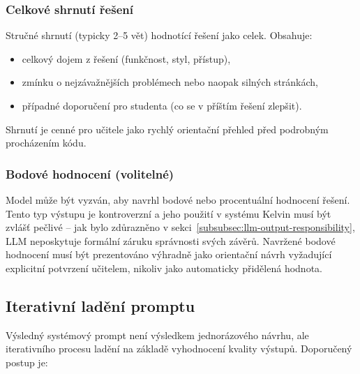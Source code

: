 \subsubsection*{Celkové shrnutí řešení}

Stručné shrnutí (typicky 2--5 vět) hodnotící řešení jako celek.
Obsahuje:
\begin{itemize}
    \item celkový dojem z řešení (funkčnost, styl, přístup),
    \item zmínku o nejzávažnějších problémech nebo naopak silných stránkách,
    \item případné doporučení pro studenta (co se v příštím řešení zlepšit).
\end{itemize}

Shrnutí je cenné pro učitele jako rychlý orientační přehled před podrobným procházením kódu.

\subsubsection*{Bodové hodnocení (volitelné)}

Model může být vyzván, aby navrhl bodové nebo procentuální hodnocení řešení.
Tento typ výstupu je kontroverzní a jeho použití v systému Kelvin musí být zvlášť pečlivé -- jak bylo zdůrazněno v sekci~\ref{subsubsec:llm-output-responsibility}, LLM neposkytuje formální záruku správnosti svých závěrů.
Navržené bodové hodnocení musí být prezentováno výhradně jako orientační návrh vyžadující explicitní potvrzení učitelem, nikoliv jako automaticky přidělená hodnota.

\subsection{Iterativní ladění promptu}
\label{subsec:prompts-iterative}

Výsledný systémový prompt není výsledkem jednorázového návrhu, ale iterativního procesu ladění na základě vyhodnocení kvality výstupů.
Doporučený postup je:

